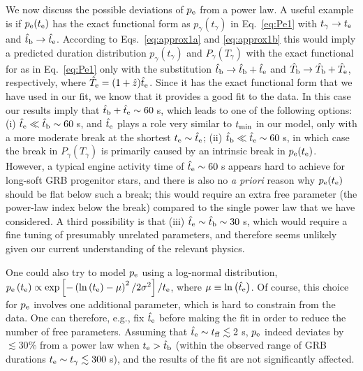 \documentclass[useAMS,usenatbib]{mn2e}
\begin{document}
We now discuss the possible deviations of $p_{\rm e}$ from a power law. A useful example is if $p_{\rm e}\!\left(t_{\rm e}\right)$ has the exact functional form as $p_\gamma\!\left(t_\gamma\right)$ in Eq.~\eqref{eq:Pe1} with $t_\gamma\to t_{\rm e}$ and $\hat{t}_{\rm b}\to\hat{t}_{\rm e}$. According to Eqs.~\eqref{eq:approx1a} and \eqref{eq:approx1b} this would imply a predicted duration distribution $p_\gamma\left(t_\gamma\right)$ and $P_\gamma\left(T_\gamma\right)$ with the exact functional for as in Eq.~\eqref{eq:Pe1} only with the substitution $\hat{t}_{\rm b}\to\hat{t}_{\rm b}+\hat{t}_{\rm e}$ and $\hat{T}_{\rm b}\to\hat{T}_{\rm b}+\hat{T}_{\rm e}$, respectively, where $\hat{T}_{\rm e}=(1+\hat{z})\hat{t}_{\rm e}$. Since it has the exact functional form that we have used in our fit, we know that it provides a good fit to the data. In this case our results imply that $\hat{t}_{\rm b}+\hat{t}_{\rm e}\sim60\;$s, which leads to one of the following options: (i) $\hat{t}_{\rm e}\ll\hat{t}_{\rm b}\sim 60\;$s, and $\hat{t}_{\rm e}$ plays a role very similar to $t_{\rm min}$ in our model, only with a more moderate break at the shortest $t_{\rm e}\sim\hat{t}_{\rm e}$; (ii) $\hat{t}_{\rm b}\ll \hat{t}_{\rm e}\sim60\;$s, in which case the break in $P_\gamma\left(T_\gamma\right)$ is primarily caused by an intrinsic break in $p_{\rm e}\!\left(t_{\rm e}\right)$.
However, a typical engine activity time of $\hat{t}_{\rm e}\sim60\;$s appears hard to achieve for long-soft GRB progenitor stars, and there is also no {\it a priori} reason why $p_{\rm e}\!\left(t_{\rm e}\right)$ should be flat below such a break; this would require an extra free parameter (the power-law index below the break) compared to the single power law that we have considered.
A third possibility is that (iii) $\hat{t}_{\rm e}\sim\hat{t}_{\rm b}\sim 30\;$s, which would require a fine tuning of presumably unrelated parameters, and therefore seems unlikely given our current understanding of the relevant physics.

One could also try to model $p_{\rm e}$ using a log-normal distribution, $p_{\rm e}\left(t_{\rm e}\right)\propto \exp\left[-\left(\ln\left(t_{\rm e}\right) -\mu\right)^2/2\sigma^2\right]/t_{\rm e}$, where $\mu \equiv \ln\left(\hat{t}_{\rm e}\right)$. Of course, this choice for $p_{\rm e}$ involves one additional parameter, which is hard to constrain from the data. One can therefore, e.g., fix $\hat{t}_{\rm e}$ before making the fit in order to reduce the number of free parameters. Assuming that $\hat{t}_{\rm e}\sim t_{\rm ff}\lesssim 2\;$s, $p_{\rm e}$ indeed deviates by $\lesssim 30\%$ from a power law when $t_{\rm e}>\hat{t}_{\rm b}$ (within the observed range of GRB durations $t_{\rm e}\sim t_\gamma\lesssim 300\;$s), and the results of the fit are not significantly affected.
\end{document}
